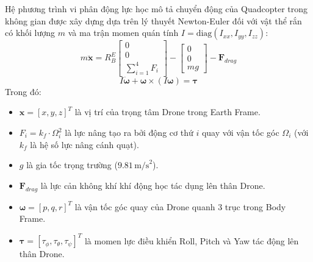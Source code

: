 Hệ phương trình vi phân động lực học mô tả chuyển động của Quadcopter trong không gian được xây dựng dựa trên lý thuyết Newton-Euler đối với vật thể rắn có khối lượng $m$ và ma trận momen quán tính $I = \text{diag}(I_{xx}, I_{yy}, I_{zz})$:
\begin{equation}
m \ddot{\mathbf{x}} = R_{B}^{E} \begin{bmatrix} 0 \\ 0 \\ \sum_{i=1}^{4} F_i \end{bmatrix} - \begin{bmatrix} 0 \\ 0 \\ mg \end{bmatrix} - \mathbf{F}_{drag}
\end{equation}
\begin{equation}
I \dot{\boldsymbol{\omega}} + \boldsymbol{\omega} \times (I \boldsymbol{\omega}) = \boldsymbol{\tau}
\end{equation}
Trong đó:
\begin{itemize}
    \item $\mathbf{x} = [x, y, z]^T$ là vị trí của trọng tâm Drone trong Earth Frame.
    \item $F_i = k_f \cdot \Omega_i^2$ là lực nâng tạo ra bởi động cơ thứ $i$ quay với vận tốc góc $\Omega_i$ (với $k_f$ là hệ số lực nâng cánh quạt).
    \item $g$ là gia tốc trọng trường ($9.81\,\text{m/s}^2$).
    \item $\mathbf{F}_{drag}$ là lực cản không khí khí động học tác dụng lên thân Drone.
    \item $\boldsymbol{\omega} = [p, q, r]^T$ là vận tốc góc quay của Drone quanh 3 trục trong Body Frame.
    \item $\boldsymbol{\tau} = [\tau_\phi, \tau_\theta, \tau_\psi]^T$ là momen lực điều khiển Roll, Pitch và Yaw tác động lên thân Drone.
\end{itemize}

